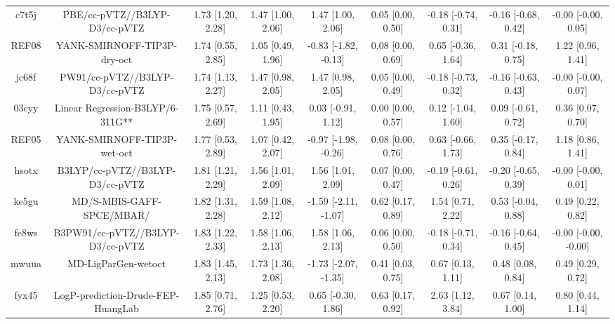 \documentclass{article}
\begin{document}
\begin{center}
\begin{longtable}{|ccccccccc|}
 c7t5j &                      PBE/cc-pVTZ//B3LYP-D3/cc-pVTZ &  1.73 [1.20, 2.28] &  1.47 [1.00, 2.06] &     1.47 [1.00, 2.06] &  0.05 [0.00, 0.50] &  -0.18 [-0.74, 0.31] &  -0.16 [-0.68, 0.42] &   -0.00 [-0.00, 0.05] \\
 REF08 &                        YANK-SMIRNOFF-TIP3P-dry-oct &  1.74 [0.55, 2.85] &  1.05 [0.49, 1.96] &  -0.83 [-1.82, -0.13] &  0.08 [0.00, 0.69] &   0.65 [-0.36, 1.64] &   0.31 [-0.18, 0.75] &     1.22 [0.96, 1.41] \\
 jc68f &                     PW91/cc-pVTZ//B3LYP-D3/cc-pVTZ &  1.74 [1.13, 2.27] &  1.47 [0.98, 2.05] &     1.47 [0.98, 2.05] &  0.05 [0.00, 0.49] &  -0.18 [-0.73, 0.32] &  -0.16 [-0.63, 0.43] &   -0.00 [-0.00, 0.07] \\
 03cyy &                   Linear Regression-B3LYP/6-311G** &  1.75 [0.57, 2.69] &  1.11 [0.43, 1.95] &    0.03 [-0.91, 1.12] &  0.00 [0.00, 0.57] &   0.12 [-1.04, 1.60] &   0.09 [-0.61, 0.72] &     0.36 [0.07, 0.70] \\
 REF05 &                        YANK-SMIRNOFF-TIP3P-wet-oct &  1.77 [0.53, 2.89] &  1.07 [0.42, 2.07] &  -0.97 [-1.98, -0.26] &  0.08 [0.00, 0.76] &   0.63 [-0.66, 1.73] &   0.35 [-0.17, 0.84] &     1.18 [0.86, 1.41] \\
 hsotx &                    B3LYP/cc-pVTZ//B3LYP-D3/cc-pVTZ &  1.81 [1.21, 2.29] &  1.56 [1.01, 2.09] &     1.56 [1.01, 2.09] &  0.07 [0.00, 0.47] &  -0.19 [-0.61, 0.26] &  -0.20 [-0.65, 0.39] &   -0.00 [-0.00, 0.01] \\
 ke5gu &                          MD/S-MBIS-GAFF-SPCE/MBAR/ &  1.82 [1.31, 2.28] &  1.59 [1.08, 2.12] &  -1.59 [-2.11, -1.07] &  0.62 [0.17, 0.89] &    1.54 [0.71, 2.22] &   0.53 [-0.04, 0.88] &     0.49 [0.22, 0.82] \\
 fe8ws &                   B3PW91/cc-pVTZ//B3LYP-D3/cc-pVTZ &  1.83 [1.22, 2.33] &  1.58 [1.06, 2.13] &     1.58 [1.06, 2.13] &  0.06 [0.00, 0.50] &  -0.18 [-0.71, 0.34] &  -0.16 [-0.64, 0.45] &  -0.00 [-0.00, -0.00] \\
 mwuua &                                MD-LigParGen-wetoct &  1.83 [1.45, 2.13] &  1.73 [1.36, 2.08] &  -1.73 [-2.07, -1.35] &  0.41 [0.03, 0.75] &    0.67 [0.13, 1.11] &    0.48 [0.08, 0.84] &     0.49 [0.29, 0.72] \\
 fyx45 &                 LogP-prediction-Drude-FEP-HuangLab &  1.85 [0.71, 2.76] &  1.25 [0.53, 2.20] &    0.65 [-0.30, 1.86] &  0.63 [0.17, 0.92] &    2.63 [1.12, 3.84] &    0.67 [0.14, 1.00] &     0.80 [0.44, 1.14] \\

\end{longtable}
\end{center}
\end{document}
